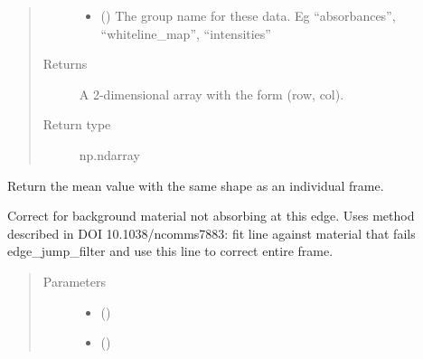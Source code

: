 \documentclass[letterpaper,10pt,english]{sphinxmanual}
\begin{document}
\begin{fulllineitems}
\begin{fulllineitems}
\begin{quote}
\begin{description}
\begin{itemize}
\item {} 
 () \textendash{} The group name for these data. Eg “absorbances”,
“whiteline\_map”, “intensities”

\end{itemize}

\item[{Returns}] \leavevmode
{} \textendash{} A 2-dimensional array with the form (row, col).

\item[{Return type}] \leavevmode
np.ndarray

\end{description}\end{quote}

\end{fulllineitems}


\begin{fulllineitems}
\label{\detokenize{xanespy:xanespy.xanes_frameset.XanesFrameset.mean_frame}}
Return the mean value with the same shape as an individual
frame.

\end{fulllineitems}


\begin{fulllineitems}
\label{\detokenize{xanespy:xanespy.xanes_frameset.XanesFrameset.normalize}}
Correct for background material not absorbing at this edge. Uses
method described in DOI 10.1038/ncomms7883: fit line against
material that fails edge\_jump\_filter and use this line to
correct entire frame.
\begin{quote}\begin{description}
\item[{Parameters}] \leavevmode\begin{itemize}
\item {} 
 (\sphinxstyleliteralemphasis{-}) \textendash{} 

\item {} 
 () \textendash{} 


\end{itemize}
\end{description}
\end{quote}
\end{fulllineitems}
\end{fulllineitems}
\end{document}
